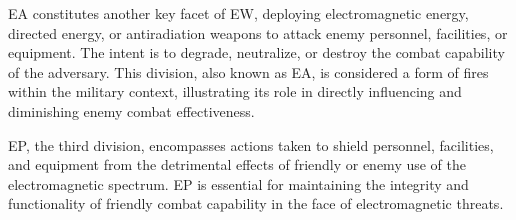 \documentclass[english, 12pt, a4paper, elec, utf8, a-1b, online]{aaltothesis}
\begin{document}
EA constitutes another key facet of EW, deploying electromagnetic energy, directed energy, or antiradiation weapons to attack enemy personnel, facilities, or equipment. The intent is to degrade, neutralize, or destroy the combat capability of the adversary.
This division, also known as EA, is considered a form of fires within the military context, illustrating its role in directly influencing and diminishing enemy combat effectiveness.

EP, the third division, encompasses actions taken to shield personnel, facilities, and equipment from the detrimental effects of friendly or enemy use of the electromagnetic spectrum. EP is essential for maintaining the integrity and functionality of friendly combat capability in the face of electromagnetic threats.





\end{document}
